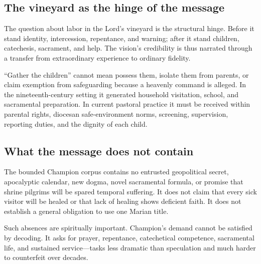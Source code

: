 \subsection{The vineyard as the hinge of the message}

The question about labor in the Lord's vineyard is the structural hinge. Before it stand identity, intercession, repentance, and warning; after it stand children, catechesis, sacrament, and help. The vision's credibility is thus narrated through a transfer from extraordinary experience to ordinary fidelity.

“Gather the children” cannot mean possess them, isolate them from parents, or claim exemption from safeguarding because a heavenly command is alleged. In the nineteenth-century setting it generated household visitation, school, and sacramental preparation. In current pastoral practice it must be received within parental rights, diocesan safe-environment norms, screening, supervision, reporting duties, and the dignity of each child.

\subsection{What the message does not contain}

The bounded Champion corpus contains no entrusted geopolitical secret, apocalyptic calendar, new dogma, novel sacramental formula, or promise that shrine pilgrims will be spared temporal suffering. It does not claim that every sick visitor will be healed or that lack of healing shows deficient faith. It does not establish a general obligation to use one Marian title.

Such absences are spiritually important. Champion's demand cannot be satisfied by decoding. It asks for prayer, repentance, catechetical competence, sacramental life, and sustained service---tasks less dramatic than speculation and much harder to counterfeit over decades.
